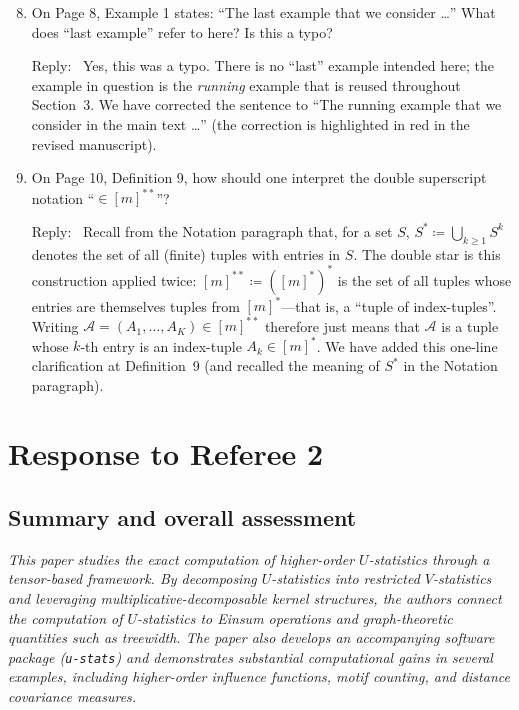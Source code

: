 \documentclass[12pt]{article}
\newenvironment{reply}{\par\smallskip\noindent\color{blue}Reply:\ \ignorespaces}{\par}
\newcommand{\calA}{\mathcal{A}}
\begin{document}
\begin{enumerate}
\setcounter{enumi}{7}

\item On Page 8, Example 1 states: ``The last example that we consider \ldots'' What does ``last example'' refer to here? Is this a typo?

\begin{reply}
Yes, this was a typo. There is no ``last'' example intended here; the example in question is the \emph{running} example that is reused throughout Section~3. We have corrected the sentence to ``The running example that we consider in the main text \ldots'' (the correction is highlighted in red in the revised manuscript).
\end{reply}

\item On Page 10, Definition 9, how should one interpret the double superscript notation ``$\in [m]^{**}$''?

\begin{reply}
Recall from the Notation paragraph that, for a set $S$, $S^{*}\coloneqq\bigcup_{k\ge 1}S^{k}$ denotes the set of all (finite) tuples with entries in $S$. The double star is this construction applied twice: $[m]^{**}\coloneqq([m]^{*})^{*}$ is the set of all tuples whose entries are themselves tuples from $[m]^{*}$---that is, a ``tuple of index-tuples''. Writing $\calA=(A_1,\dots,A_K)\in[m]^{**}$ therefore just means that $\calA$ is a tuple whose $k$-th entry is an index-tuple $A_k\in[m]^{*}$. We have added this one-line clarification at Definition~9 (and recalled the meaning of $S^{*}$ in the Notation paragraph).
\end{reply}

\end{enumerate}

\newpage


\section*{Response to Referee 2}

\subsection*{Summary and overall assessment}

\emph{This paper studies the exact computation of higher-order $U$-statistics through a tensor-based framework. By decomposing $U$-statistics into restricted $V$-statistics and leveraging multiplicative-decomposable kernel structures, the authors connect the computation of $U$-statistics to Einsum operations and graph-theoretic quantities such as treewidth. The paper also develops an accompanying software package (\texttt{u-stats}) and demonstrates substantial computational gains in several examples, including higher-order influence functions, motif counting, and distance covariance measures.}
\end{document}
